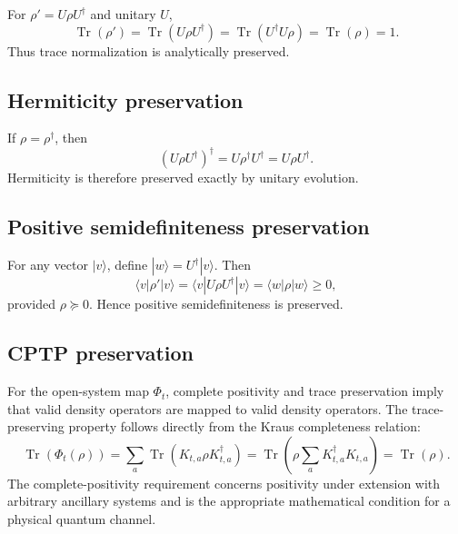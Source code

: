 \documentclass[final,3p,times]{elsarticle}
\begin{document}
For $\rho'=U\rho U^\dagger$ and unitary $U$,
\begin{equation}
    \operatorname{Tr}(\rho')
    =\operatorname{Tr}(U\rho U^\dagger)
    =\operatorname{Tr}(U^\dagger U\rho)
    =\operatorname{Tr}(\rho)=1.
\end{equation}
Thus trace normalization is analytically preserved.

\subsection{Hermiticity preservation}

If $\rho=\rho^\dagger$, then
\begin{equation}
    (U\rho U^\dagger)^\dagger
    =U\rho^\dagger U^\dagger
    =U\rho U^\dagger.
\end{equation}
Hermiticity is therefore preserved exactly by unitary evolution.

\subsection{Positive semidefiniteness preservation}

For any vector $|v\rangle$, define $|w\rangle=U^\dagger|v\rangle$. Then
\begin{equation}
    \langle v|\rho'|v\rangle
    =\langle v|U\rho U^\dagger|v\rangle
    =\langle w|\rho|w\rangle
    \geq0,
\end{equation}
provided $\rho\succeq0$. Hence positive semidefiniteness is preserved.

\subsection{CPTP preservation}

For the open-system map $\Phi_t$, complete positivity and trace preservation imply that valid density operators are mapped to valid density operators. The trace-preserving property follows directly from the Kraus completeness relation:
\begin{equation}
    \operatorname{Tr}(\Phi_t(\rho))
    =\sum_a\operatorname{Tr}(K_{t,a}\rho K_{t,a}^\dagger)
    =\operatorname{Tr}\left(\rho\sum_aK_{t,a}^\dagger K_{t,a}\right)
    =\operatorname{Tr}(\rho).
\end{equation}
The complete-positivity requirement concerns positivity under extension with arbitrary ancillary systems and is the appropriate mathematical condition for a physical quantum channel.
\end{document}
